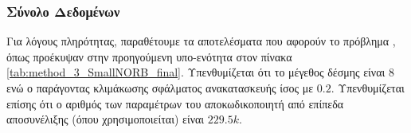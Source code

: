 \begin{table}[h]
    \begin{center}
    \end{center}
    \caption[]{\label{tab:method_3_CIFAR10_final}Επίδωση των αλγορίθμων της μεθόδου 3 στο σύνολο δεδομένων , όταν χρησιμοποιούνται 30 εποχές για την εκπαίδευση του μοντέλου με μέγεθος δέσμης 32.} 
\end{table}

\subsubsection{Σύνολο Δεδομένων }

Για λόγους πληρότητας, παραθέτουμε τα αποτελέσματα που αφορούν το πρόβλημα , όπως προέκυψαν στην προηγούμενη υπο-ενότητα στον πίνακα \ref{tab:method_3_SmallNORB_final}. Υπενθυμίζεται ότι το μέγεθος δέσμης είναι 8 ενώ ο παράγοντας κλιμάκωσης σφάλματος ανακατασκευής ίσος με $0.2$. Υπενθυμίζεται επίσης ότι ο αριθμός των παραμέτρων του αποκωδικοποιητή από επίπεδα αποσυνέλιξης (όπου χρησιμοποιείται) είναι $229.5k$.

